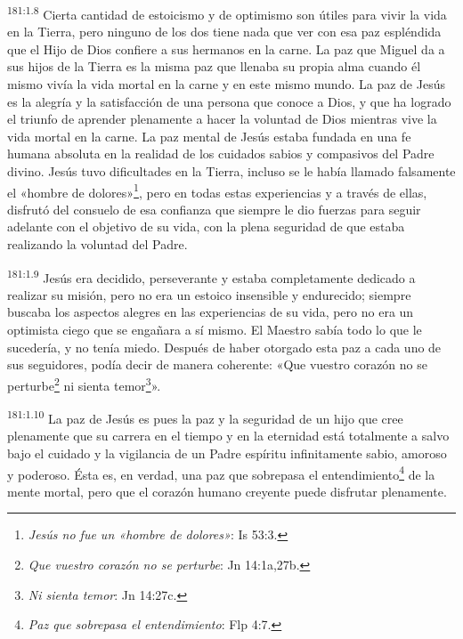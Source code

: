 \par 
\textsuperscript{181:1.8} Cierta cantidad de estoicismo y de optimismo son útiles para vivir la vida en la Tierra, pero ninguno de los dos tiene nada que ver con esa paz espléndida que el Hijo de Dios confiere a sus hermanos en la carne. La paz que Miguel da a sus hijos de la Tierra es la misma paz que llenaba su propia alma cuando él mismo vivía la vida mortal en la carne y en este mismo mundo. La paz de Jesús es la alegría y la satisfacción de una persona que conoce a Dios, y que ha logrado el triunfo de aprender plenamente a hacer la voluntad de Dios mientras vive la vida mortal en la carne. La paz mental de Jesús estaba fundada en una fe humana absoluta en la realidad de los cuidados sabios y compasivos del Padre divino. Jesús tuvo dificultades en la Tierra, incluso se le había llamado falsamente el «hombre de dolores»\footnote{\textit{Jesús no fue un «hombre de dolores»}: Is 53:3.}, pero en todas estas experiencias y a través de ellas, disfrutó del consuelo de esa confianza que siempre le dio fuerzas para seguir adelante con el objetivo de su vida, con la plena seguridad de que estaba realizando la voluntad del Padre.

\par 
\textsuperscript{181:1.9} Jesús era decidido, perseverante y estaba completamente dedicado a realizar su misión, pero no era un estoico insensible y endurecido; siempre buscaba los aspectos alegres en las experiencias de su vida, pero no era un optimista ciego que se engañara a sí mismo. El Maestro sabía todo lo que le sucedería, y no tenía miedo. Después de haber otorgado esta paz a cada uno de sus seguidores, podía decir de manera coherente: «Que vuestro corazón no se perturbe\footnote{\textit{Que vuestro corazón no se perturbe}: Jn 14:1a,27b.} ni sienta temor\footnote{\textit{Ni sienta temor}: Jn 14:27c.}».

\par 
\textsuperscript{181:1.10} La paz de Jesús es pues la paz y la seguridad de un hijo que cree plenamente que su carrera en el tiempo y en la eternidad está totalmente a salvo bajo el cuidado y la vigilancia de un Padre espíritu infinitamente sabio, amoroso y poderoso. Ésta es, en verdad, una paz que sobrepasa el entendimiento\footnote{\textit{Paz que sobrepasa el entendimiento}: Flp 4:7.} de la mente mortal, pero que el corazón humano creyente puede disfrutar plenamente.

